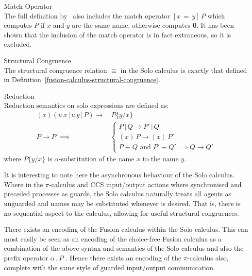     \begin{remark*}{Match Operator\\}
        The full definition by~\cite{solo-calculus} also includes the match operator $[x \, = \, y] \, P$ which computes $P$ if $x$ and $y$ are the same name, otherwise computes \textbf{0}.
        It has been shown that the inclusion of the match operator is in fact extraneous, so it is excluded.
    \end{remark*}


    \begin{definition}{Structural Congruence\\}
        The structural congruence relation $\equiv$ in the Solo calculus is exactly that defined in Definition~\ref{fusion-calculus-structural-congruence}.
    \end{definition}


    \begin{definition}{Reduction\\}
        Reduction semantics on solo expressions are defined as:
        \begin{align*}
            (x)(\bar{u} \, x \, | \, u \, y \, | \, P) \rightarrow & \, P\{y / x\} \\
            P \rightarrow P' \implies &
            \begin{cases}
                P \, | \, Q \rightarrow P' \, | \, Q \\
                (x) \, P \rightarrow (x) \, P' \\
                P \equiv Q \text{ and } P' \equiv Q' \implies Q \rightarrow Q'
            \end{cases}
        \end{align*}
        where $P\{y / x\}$ is $\alpha$-substitution of the name $x$ to the name $y$.
    \end{definition}
    It is interesting to note here the asynchronous behaviour of the Solo calculus.
    Where in the $\pi$-calculus and CCS input/output actions where synchronised and preceded processes as guards, the Solo calculus naturally treats all agents as unguarded and names may be substituted whenever is desired.
    That is, there is no sequential aspect to the calculus, allowing for useful structural congruences.


    \begin{remark*}
        There exists an encoding of the Fusion calculus within the Solo calculus.
        This can most easily be seen as an encoding of the choice-free Fusion calculus as a combination of the above syntax and semantics of the Solo calculus and also the prefix operator $\alpha \, . \, P$\footnotemark
        .
        Hence there exists an encoding of the $\pi$-calculus also, complete with the same style of guarded input/output communication.
    \end{remark*}
